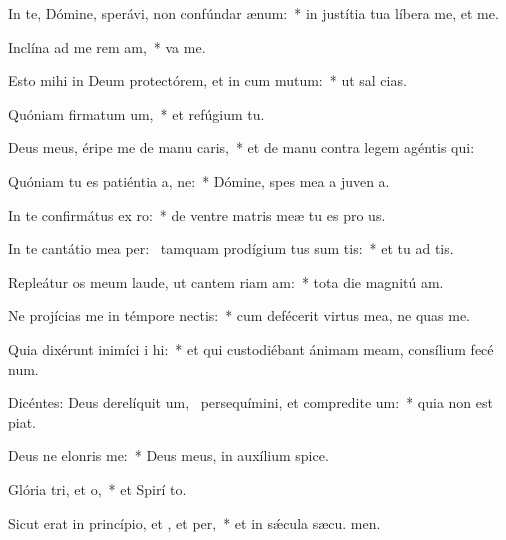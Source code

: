 \item In te, Dómine, sperávi, non confúndar  ænum:~* in justítia tua líbera me, et  me.
\item Inclína ad me rem am,~*  va me.
\item Esto mihi in Deum protectórem, et in cum mutum:~* ut sal  cias.
\item Quóniam firmatum um,~* et refúgium   tu.
\item Deus meus, éripe me de manu caris,~* et de manu contra legem agéntis  qui:
\item Quóniam tu es patiéntia a, ne:~* Dómine, spes mea a juven a.
\item In te confirmátus  ex ro:~* de ventre matris meæ tu es pro us.
\item In te cantátio mea per:~\pscross{} tamquam prodígium tus sum tis:~* et tu ad tis.
\item Repleátur os meum laude, ut cantem riam am:~* tota die magnitú am.
\item Ne projícias me in témpore nectis:~* cum defécerit virtus mea, ne quas me.
\item Quia dixérunt inimíci i hi:~* et qui custodiébant ánimam meam, consílium fecé  num.
\item Dicéntes: Deus derelíquit um,~\pscross{} persequímini, et compredite um:~* quia non est  piat.
\item Deus ne elonris  me:~* Deus meus, in auxílium  spice.
\item Glória tri, et o,~* et Spirí to.
\item Sicut erat in princípio, et , et per,~* et in sǽcula sæcu. men.
